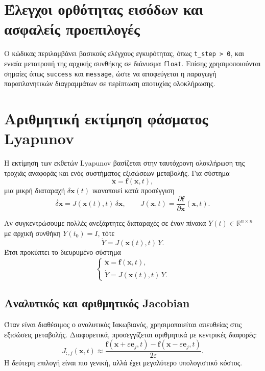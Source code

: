 \documentclass[11pt,a4paper]{report}
\begin{document}
\section{Έλεγχοι ορθότητας εισόδων και ασφαλείς προεπιλογές}
\label{app:input-checks}
Ο κώδικας περιλαμβάνει βασικούς ελέγχους εγκυρότητας, όπως
\texttt{t\_step > 0}, και ενιαία μετατροπή της αρχικής συνθήκης σε διάνυσμα
\texttt{float}. Επίσης χρησιμοποιούνται σημαίες όπως \texttt{success} και
\texttt{message}, ώστε να αποφεύγεται η παραγωγή παραπλανητικών διαγραμμάτων σε
περίπτωση αποτυχίας ολοκλήρωσης.

\section{Αριθμητική εκτίμηση φάσματος Lyapunov}
\label{app:lyapunov}

Η εκτίμηση των εκθετών Lyapunov βασίζεται στην ταυτόχρονη ολοκλήρωση της
τροχιάς αναφοράς και ενός συστήματος εξισώσεων μεταβολής. Για σύστημα
\begin{equation}
\dot{\mathbf{x}}=\mathbf{f}(\mathbf{x},t),
\end{equation}
μια μικρή διαταραχή $\delta\mathbf{x}(t)$ ικανοποιεί κατά προσέγγιση
\begin{equation}
\dot{\delta\mathbf{x}} = J(\mathbf{x}(t),t)\,\delta\mathbf{x},
\qquad
J(\mathbf{x},t)=\frac{\partial \mathbf{f}}{\partial \mathbf{x}}(\mathbf{x},t).
\end{equation}

Αν συγκεντρώσουμε πολλές ανεξάρτητες διαταραχές σε έναν πίνακα
$Y(t)\in\mathbb{R}^{n\times n}$ με αρχική συνθήκη $Y(t_0)=I$, τότε
\begin{equation}
\dot{Y}=J(\mathbf{x}(t),t)\,Y.
\end{equation}
Έτσι προκύπτει το διευρυμένο σύστημα
\begin{equation}
\begin{cases}
\dot{\mathbf{x}} = \mathbf{f}(\mathbf{x},t),\\
\dot{Y} = J(\mathbf{x}(t),t)\,Y.
\end{cases}
\end{equation}

\subsection{Αναλυτικός και αριθμητικός Jacobian}
\label{app:lyapunov-jacobian}

Όταν είναι διαθέσιμος ο αναλυτικός Ιακωβιανός, χρησιμοποιείται απευθείας στις
εξισώσεις μεταβολής. Διαφορετικά, προσεγγίζεται αριθμητικά με κεντρικές
διαφορές:
\begin{equation}
J_{:,j}(\mathbf{x},t)\approx
\frac{\mathbf{f}(\mathbf{x}+\varepsilon \mathbf{e}_j,t)-\mathbf{f}(\mathbf{x}-\varepsilon \mathbf{e}_j,t)}{2\varepsilon}.
\end{equation}
Η δεύτερη επιλογή είναι πιο γενική, αλλά έχει μεγαλύτερο υπολογιστικό κόστος.
\end{document}
